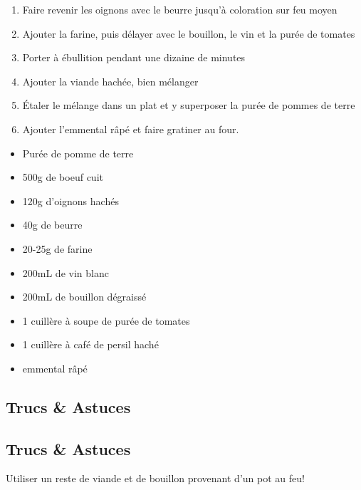     \begin{minipage}{.7\textwidth}
        \begin{enumerate}
            \item Faire revenir les oignons avec le beurre jusqu'à coloration sur feu moyen
	    \item Ajouter la farine, puis délayer avec le bouillon, le vin et la purée de tomates
	    \item Porter à ébullition pendant une dizaine de minutes
	    \item Ajouter la viande hachée, bien mélanger
	    \item Étaler le mélange dans un plat et y superposer la purée de pommes de terre
	    \item Ajouter l'emmental râpé et faire gratiner au four.

        \end{enumerate}
    \end{minipage}
    \begin{minipage}{.3\textwidth}
        \begin{flushleft}
        \begin{itemize}
            \item Purée de pomme de terre
	    \item 500g de boeuf cuit
	    \item 120g d'oignons hachés
	    \item 40g de beurre
	    \item 20-25g de farine
	    \item 200mL de vin blanc
	    \item 200mL de bouillon dégraissé
	    \item 1 cuillère à soupe de purée de tomates
	    \item 1 cuillère à café de persil haché
	    \item emmental râpé

        \end{itemize}
        \end{flushleft}
    \end{minipage}
    
    \vspace{1cm}
    \hline
    \vspace{1cm}
    
    \subsection{Trucs \& Astuces}
        \subsection{Trucs \& Astuces}
	Utiliser un reste de viande et de bouillon provenant d'un pot au feu!
